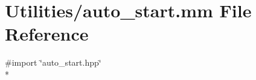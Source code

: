 \hypertarget{auto__start_8mm}{\section{Utilities/auto\+\_\+start.mm File Reference}
\label{auto__start_8mm}
}
{\ttfamily \#import \char`\"{}auto\+\_\+start.\+hpp\char`\"{}}\\*
